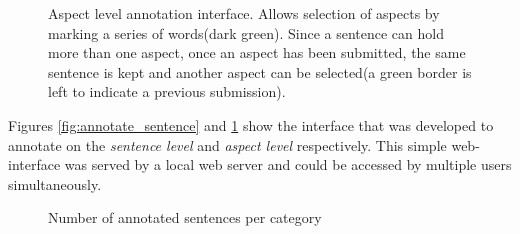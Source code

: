 \documentclass[a4paper,11pt]{kth-mag}
\begin{document}
\begin{figure}[h]
  \centering
  \caption{Aspect level annotation interface. Allows selection of aspects by marking a series of words(dark green). Since a sentence can hold more than one aspect, once an aspect has been submitted, the same sentence is kept and another aspect can be selected(a green border is left to indicate a previous submission).}
  \label{fig:annotate_aspect}
\end{figure}

Figures \ref{fig:annotate_sentence} and \ref{fig:annotate_aspect} show the interface that was developed to annotate on the \emph{sentence level} and \emph{aspect level} respectively. This simple web-interface was served by a local web server and could be accessed by multiple users simultaneously.


\begin{figure}[t]
  \centering
  \caption{Number of annotated sentences per category}
  \label{fig:cat_count}
\end{figure}
\end{document}
